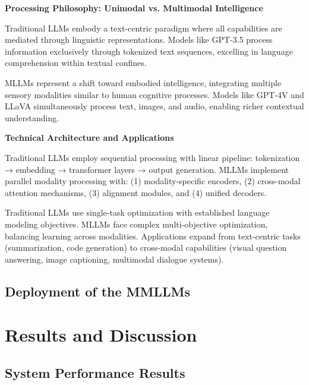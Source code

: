 \documentclass[12pt,a4paper]{article}
\begin{document}
\textbf{Processing Philosophy: Unimodal vs. Multimodal Intelligence}

Traditional LLMs embody a text-centric paradigm where all capabilities are mediated through linguistic representations. Models like GPT-3.5 process information exclusively through tokenized text sequences, excelling in language comprehension within textual confines.

MLLMs represent a shift toward embodied intelligence, integrating multiple sensory modalities similar to human cognitive processes. Models like GPT-4V and LLaVA simultaneously process text, images, and audio, enabling richer contextual understanding.

\textbf{Technical Architecture and Applications}

Traditional LLMs employ sequential processing with linear pipeline: tokenization → embedding → transformer layers → output generation. MLLMs implement parallel modality processing with: (1) modality-specific encoders, (2) cross-modal attention mechanisms, (3) alignment modules, and (4) unified decoders.

Traditional LLMs use single-task optimization with established language modeling objectives. MLLMs face complex multi-objective optimization, balancing learning across modalities. Applications expand from text-centric tasks (summarization, code generation) to cross-modal capabilities (visual question answering, image captioning, multimodal dialogue systems).


\subsection{Deployment of the MMLLMs}





\section{Results and Discussion}


\subsection{System Performance Results}

\end{document}
